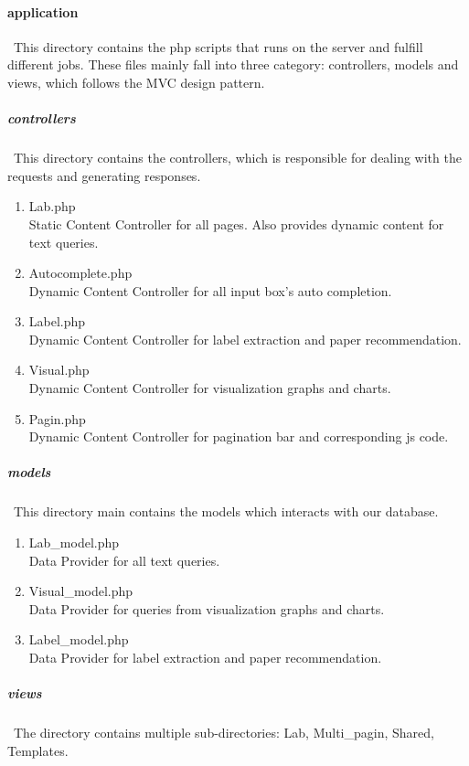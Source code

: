\documentclass[a4paper, 10pt]{article}
\begin{document}
\paragraph{application}\ 
This directory contains the php scripts that runs on the server and fulfill different jobs. These files mainly fall into three category: controllers, models and views, which follows the MVC design pattern.
\subparagraph{controllers}\ This directory contains the controllers, which is responsible for dealing with the requests and generating responses.
\begin{enumerate}
\item Lab.php\\
  Static Content Controller for all pages. Also provides dynamic content for text queries.
\item Autocomplete.php\\
  Dynamic Content Controller for all input box's auto completion.
\item Label.php\\
  Dynamic Content Controller for label extraction and paper recommendation.
\item Visual.php\\
  Dynamic Content Controller for visualization graphs and charts.
\item Pagin.php\\
  Dynamic Content Controller for pagination bar and corresponding js code.
\end{enumerate}
\subparagraph{models}\ This directory main contains the models which interacts with our database.
\begin{enumerate}
\item Lab\_model.php\\
  Data Provider for all text queries.
\item Visual\_model.php\\
  Data Provider for queries from visualization graphs and charts.
\item Label\_model.php\\
  Data Provider for label extraction and paper recommendation.
\end{enumerate}
\subparagraph{views}\ The directory contains multiple sub-directories: Lab, Multi\_pagin, Shared, Templates.
\end{document}
